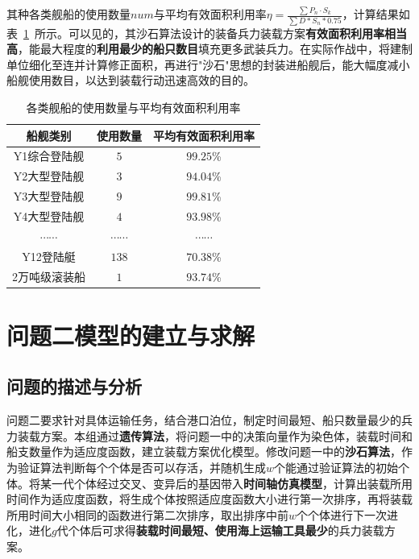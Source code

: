 \documentclass{whutmod}
\begin{document}
	其种各类舰船的使用数量$num$与平均有效面积利用率$\eta=\frac{\sum P_{n}\cdot S_{k}}{\sum D*S_{n}*0.75}$，计算结果如表~\ref{zhuansasgzai}~所示。可以见的，其沙石算法设计的装备兵力装载方案\textbf{有效面积利用率相当高}，能最大程度的\textbf{利用最少的船只数目}填充更多武装兵力。在实际作战中，将建制单位细化至连并计算修正面积，再进行"沙石"思想的封装进船舰后，能大幅度减小船舰使用数目，以达到装载行动迅速高效的目的。
	\begin{table}[H]
		\centering		\caption{各类舰船的使用数量与平均有效面积利用率}\label{zhuansasgzai}
		\begin{tabular}{ccc}
			\toprule[2pt]
			\multicolumn{1}{m{3cm}}{\centering 船舰类别}
			& \multicolumn{1}{m{3cm}}{\centering 使用数量}
			&\multicolumn{1}{m{3cm}}{\centering 平均有效面积利用率}
			\\
			\midrule[1pt]
			Y1综合登陆舰 &  $5$  &$99.25$\% \\ 
			Y2大型登陆舰	 &  $3$&$94.04$\%\\ 
			Y3大型登陆舰	 &  $9 $ &$99.81$\%\\ 
			Y4大型登陆舰	 &  $4$ &$93.98$\%\\ 
			$\cdots \cdots$	 & 	$\cdots \cdots$&	$\cdots \cdots$\\ 
			Y12登陆艇	 &  $138$ &$70.38$\%\\ 
			2万吨级滚装船  &  $1 $ &$93.74$\% \\ 
			\bottomrule[2pt]	
		\end{tabular}
	\end{table}

	
	
		
	\section{问题二模型的建立与求解}
	\subsection{问题的描述与分析}

	问题二要求针对具体运输任务，结合港口泊位，制定时间最短、船只数量最少的兵力装载方案。本组通过\textbf{遗传算法}，将问题一中的决策向量作为染色体，装载时间和船支数量作为适应度函数，建立装载方案优化模型。修改问题一中的\textbf{沙石算法}，作为验证算法判断每个个体是否可以存活，并随机生成$w$个能通过验证算法的初始个体。将某一代个体经过交叉、变异后的基因带入\textbf{时间轴仿真模型}，计算出装载所用时间作为适应度函数，将生成个体按照适应度函数大小进行第一次排序，再将装载所用时间大小相同的函数进行第二次排序，取出排序中前$w$个个体进行下一次进化，进化$g$代个体后可求得\textbf{装载时间最短、使用海上运输工具最少}的兵力装载方案。	                                                                                                   
\end{document}
